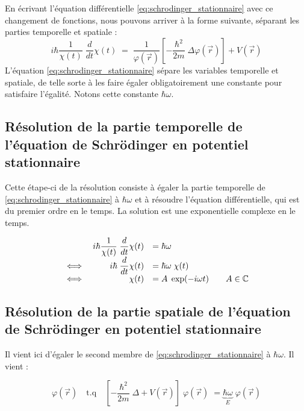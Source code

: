\documentclass{book}
\begin{document}
En écrivant l'équation différentielle \eqref{eq:schrodinger_stationnaire} avec ce changement de fonctions, nous pouvons arriver à la forme suivante, séparant les parties temporelle et spatiale :
\begin{equation}
i\hbar \dfrac{1}{\chi(t)} \; \dfrac{d}{dt} \chi(t) \; = \; \dfrac{1}{\varphi(\vec r)} \left[ -\dfrac{\hbar ^2}{2m} \; \Delta \varphi(\vec r) \right] + V(\vec r)
\end{equation}
L'équation \eqref{eq:schrodinger_stationnaire} sépare les variables temporelle et spatiale, de telle sorte à les faire égaler obligatoirement une constante pour satisfaire l'égalité. Notons cette constante $\hbar \omega$. 
\subsection{Résolution de la partie temporelle de l'équation de Schrödinger en potentiel stationnaire}
Cette étape-ci de la résolution consiste à égaler la partie temporelle de \eqref{eq:schrodinger_stationnaire} à $\hbar \omega$ et à résoudre l'équation différentielle, qui est du premier ordre en le temps. La solution est une exponentielle complexe en le temps.

\begin{equation} \label{eq:resol_stat_temps}
\begin{array}{lrl r}
& i\hbar \dfrac{1}{\chi(t)} \; \dfrac{d}{dt} \chi(t) &= \hbar \omega  &\\
\iff& i \hbar \; \dfrac{d}{dt} \chi(t) &= \hbar \omega \;  \chi(t)  &\\
\iff & \chi(t) &= A \; \exp(-i\omega t)  &\quad A \in \mathbb{C}
\end{array}
\end{equation}


\subsection{Résolution de la partie spatiale de l'équation de Schrödinger en potentiel stationnaire}
Il vient ici d'égaler le second membre de \eqref{eq:schrodinger_stationnaire} à $\hbar \omega$. Il vient :

\begin{equation} \label{eq:resol_stat_pos}
\varphi(\vec r) \quad \mathrm{t.q} \quad \left[-\dfrac{\hbar ^2}{2m} \; \Delta + V(\vec r) \right] \; \varphi(\vec r) \; = \underbrace{\hbar	\omega}_E \; \varphi(\vec r)
\end{equation}
\end{document}
